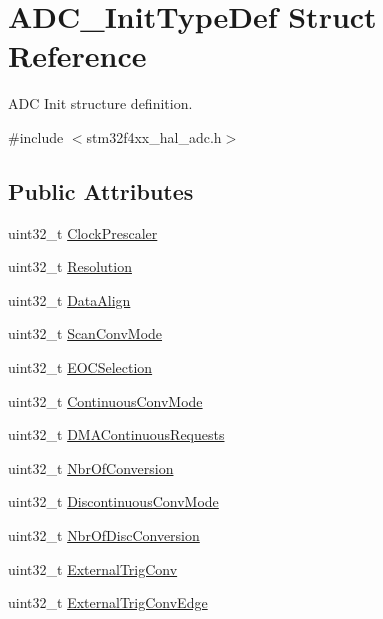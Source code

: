 \hypertarget{struct_a_d_c___init_type_def}{}\section{A\+D\+C\+\_\+\+Init\+Type\+Def Struct Reference}
\label{struct_a_d_c___init_type_def}


A\+DC Init structure definition.  




{\ttfamily \#include $<$stm32f4xx\+\_\+hal\+\_\+adc.\+h$>$}

\subsection*{Public Attributes}
\begin{DoxyCompactItemize}
\item 
uint32\+\_\+t \hyperlink{struct_a_d_c___init_type_def_a7e49d0db9ef7db8806bbfa57a1bd73a6}{Clock\+Prescaler}
\item 
uint32\+\_\+t \hyperlink{struct_a_d_c___init_type_def_abebb8d3277cb9a5aae72578076762f5d}{Resolution}
\item 
uint32\+\_\+t \hyperlink{struct_a_d_c___init_type_def_af9ec9040d55aa68c23d92d174b464ac1}{Data\+Align}
\item 
uint32\+\_\+t \hyperlink{struct_a_d_c___init_type_def_a47cd689a52562a2481059a5d8ed82788}{Scan\+Conv\+Mode}
\item 
uint32\+\_\+t \hyperlink{struct_a_d_c___init_type_def_ae3eedd269c3acc6c6933e8a252c36e71}{E\+O\+C\+Selection}
\item 
uint32\+\_\+t \hyperlink{struct_a_d_c___init_type_def_a4bf957b8be6ae85d71e9376e6f1e633b}{Continuous\+Conv\+Mode}
\item 
uint32\+\_\+t \hyperlink{struct_a_d_c___init_type_def_afa360066652d6e8a2a3f56426b756fab}{D\+M\+A\+Continuous\+Requests}
\item 
uint32\+\_\+t \hyperlink{struct_a_d_c___init_type_def_aa72b0cc3e8dac3a30097cf12093c42a7}{Nbr\+Of\+Conversion}
\item 
uint32\+\_\+t \hyperlink{struct_a_d_c___init_type_def_a35cc74067e2d269bb2f5e8d71c245b4b}{Discontinuous\+Conv\+Mode}
\item 
uint32\+\_\+t \hyperlink{struct_a_d_c___init_type_def_a5c0078be814bfe2608ae5758826eafb8}{Nbr\+Of\+Disc\+Conversion}
\item 
uint32\+\_\+t \hyperlink{struct_a_d_c___init_type_def_a47aba277f9d8f3c5774983de4ce9455b}{External\+Trig\+Conv}
\item 
uint32\+\_\+t \hyperlink{struct_a_d_c___init_type_def_aeed14631d5f1d118a252ea24edd68ede}{External\+Trig\+Conv\+Edge}
\end{DoxyCompactItemize}


